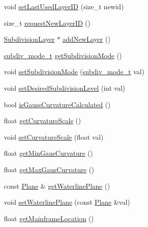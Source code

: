 \begin{DoxyCompactItemize}
\item 
void \hyperlink{classShipCAD_1_1SubdivisionSurface_aa72a8cf7c5bddaaf24ec41ad3480fe70}{set\-Last\-Used\-Layer\-I\-D} (size\-\_\-t newid)
\item 
size\-\_\-t \hyperlink{classShipCAD_1_1SubdivisionSurface_a3af3a30b53d867b2b25f9ac9290a264a}{request\-New\-Layer\-I\-D} ()
\item 
\hyperlink{classShipCAD_1_1SubdivisionLayer}{Subdivision\-Layer} $\ast$ \hyperlink{classShipCAD_1_1SubdivisionSurface_a5bf8f452664e17dae636d4b66a66eba9}{add\-New\-Layer} ()
\item 
\hyperlink{namespaceShipCAD_a4a9d1acfd6a2e1e9078a5dcc36f0c817}{subdiv\-\_\-mode\-\_\-t} \hyperlink{classShipCAD_1_1SubdivisionSurface_a77ac47de5e6323271f45be37223fe82b}{get\-Subdivision\-Mode} ()
\item 
void \hyperlink{classShipCAD_1_1SubdivisionSurface_a048dce00d2ff87aa5b31319ea41f565a}{set\-Subdivision\-Mode} (\hyperlink{namespaceShipCAD_a4a9d1acfd6a2e1e9078a5dcc36f0c817}{subdiv\-\_\-mode\-\_\-t} val)
\item 
void \hyperlink{classShipCAD_1_1SubdivisionSurface_a53271216c1be89154c08d2b2841f9a60}{set\-Desired\-Subdivision\-Level} (int val)
\item 
bool \hyperlink{classShipCAD_1_1SubdivisionSurface_aa6e07e073f76fb31d013103c8709f923}{is\-Gauss\-Curvature\-Calculated} ()
\item 
float \hyperlink{classShipCAD_1_1SubdivisionSurface_a8dfd63bd3bd8ddf35491b12003a8b7ce}{get\-Curvature\-Scale} ()
\item 
void \hyperlink{classShipCAD_1_1SubdivisionSurface_af0de3c1d862ddb2466effbcff0189845}{set\-Curvature\-Scale} (float val)
\item 
float \hyperlink{classShipCAD_1_1SubdivisionSurface_ae511889be6115d7461808eda144947a8}{get\-Min\-Gaus\-Curvature} ()
\item 
float \hyperlink{classShipCAD_1_1SubdivisionSurface_a5189aba41418c44faae76b39284917c2}{get\-Max\-Gaus\-Curvature} ()
\item 
const \hyperlink{classShipCAD_1_1Plane}{Plane} \& \hyperlink{classShipCAD_1_1SubdivisionSurface_a5f4515130c512327b01e6aea577d0876}{get\-Waterline\-Plane} ()
\item 
void \hyperlink{classShipCAD_1_1SubdivisionSurface_ae063d1a2be4e227aaefb8a3578d3f52f}{set\-Waterline\-Plane} (const \hyperlink{classShipCAD_1_1Plane}{Plane} \&val)
\item 
float \hyperlink{classShipCAD_1_1SubdivisionSurface_a8b33594cec15c0ec7aa03eb9d53327bb}{get\-Mainframe\-Location} ()

\end{DoxyCompactItemize}
